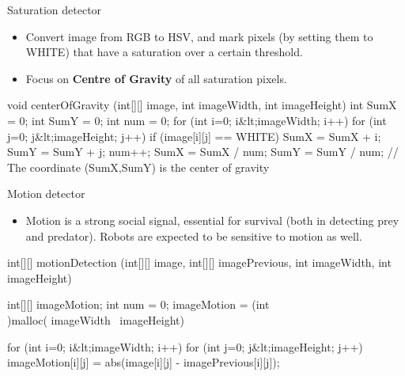 \documentclass[compress]{beamer}
\providecommand{\tightlist}{%
  \setlength{\itemsep}{0pt}\setlength{\parskip}{0pt}}
\begin{document}
\begin{frame}[fragile]{Saturation detector}

\begin{itemize}
\tightlist
\item
  Convert image from RGB to HSV, and mark pixels (by setting them to
  WHITE) that have a saturation over a certain threshold.
\item
  Focus on \textbf{Centre of Gravity} of all saturation pixels.
\end{itemize}

\begin{matlabcode}
void centerOfGravity (int[][] image, int imageWidth,
        int imageHeight)
{
    int SumX = 0;
    int SumY = 0;
    int num = 0;
    for (int i=0; i&lt;imageWidth; i++)
    {
        for (int j=0; j&lt;imageHeight; j++)
        {
            if (image[i][j] == WHITE)
            {
                SumX = SumX + i;
                SumY = SumY + j;
                num++;
            }
        }
    }
    SumX = SumX / num;
    SumY = SumY / num;
    // The coordinate (SumX,SumY) is the center of gravity
}
\end{matlabcode}

\end{frame}

\begin{frame}[fragile]{Motion detector}

\begin{itemize}
\tightlist
\item
  Motion is a strong social signal, essential for survival (both in
  detecting prey and predator). Robots are expected to be sensitive to
  motion as well.
\end{itemize}

\begin{matlabcode}
int[][] motionDetection (int[][] image,
        int[][] imagePrevious, int imageWidth, int
        imageHeight)

{
    int[][] imageMotion;
    int num = 0;
    imageMotion = (int\\)malloc( imageWidth \ imageHeight)

    for (int i=0; i&lt;imageWidth; i++)
    {
        for (int j=0; j&lt;imageHeight; j++)
        {
            imageMotion[i][j] = abs(image[i][j] - imagePrevious[i][j]);
        }
    }
}
\end{matlabcode}

\end{frame}
\end{document}
